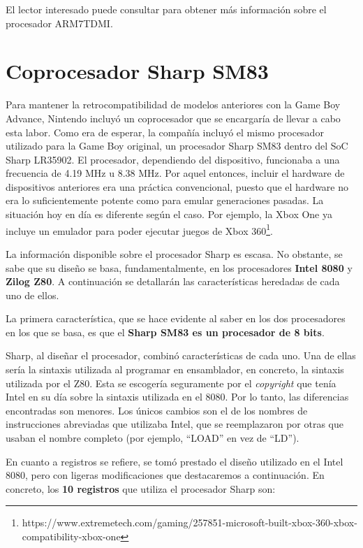 \begin{enumerate}
\end{enumerate}

El lector interesado puede consultar \cite{bib:arm} para obtener más información sobre el procesador ARM7TDMI.

\section{Coprocesador Sharp SM83}
Para mantener la retrocompatibilidad de modelos anteriores con la Game Boy Advance, Nintendo incluyó un coprocesador que se encargaría de llevar a cabo esta labor. Como era de esperar, la compañía incluyó el mismo procesador utilizado para la Game Boy original, un procesador Sharp SM83 dentro del SoC Sharp LR35902. El procesador, dependiendo del dispositivo, funcionaba a una frecuencia de 4.19 MHz u 8.38 MHz. Por aquel entonces, incluir el hardware de dispositivos anteriores era una práctica convencional, puesto que el hardware no era lo suficientemente potente como para emular generaciones pasadas. La situación hoy en día es diferente según el caso. Por ejemplo, la Xbox One ya incluye un emulador para poder ejecutar juegos de Xbox 360\footnote{https://www.extremetech.com/gaming/257851-microsoft-built-xbox-360-xbox-compatibility-xbox-one}. 

La información disponible sobre el procesador Sharp es escasa. No obstante, se sabe que su diseño se basa, fundamentalmente, en los procesadores \textbf{Intel 8080} y \textbf{Zilog Z80}. A continuación se detallarán las características heredadas de cada uno de ellos.

La primera característica, que se hace evidente al saber en los dos procesadores en los que se basa, es que el \textbf{Sharp SM83 es un procesador de 8 bits}.

Sharp, al diseñar el procesador, combinó características de cada uno. Una de ellas sería la sintaxis utilizada al programar en ensamblador, en concreto, la sintaxis utilizada por el Z80. Esta se escogería seguramente por el \textit{copyright} que tenía Intel en su día sobre la sintaxis utilizada en el 8080. Por lo tanto, las diferencias encontradas son menores. Los únicos cambios son el de los nombres de instrucciones abreviadas que utilizaba Intel, que se reemplazaron por otras que usaban el nombre completo (por ejemplo, ``LOAD'' en vez de ``LD'').

En cuanto a registros se refiere, se tomó prestado el diseño utilizado en el Intel 8080, pero con ligeras modificaciones que destacaremos a continuación. En concreto, los \textbf{10 registros} que utiliza el procesador Sharp son:

